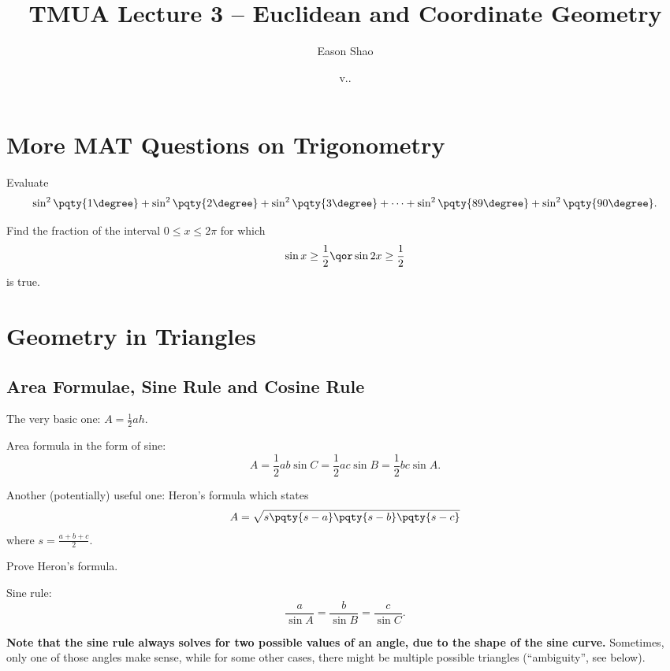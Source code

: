 \documentclass{article}
\title{TMUA Lecture 3 -- Euclidean and Coordinate Geometry}
\author{Eason Shao}
\date{v.\DATE.\COMMITSHA}
\begin{document}
\maketitle

\tableofcontents

\section*{More MAT Questions on Trigonometry}

\begin{example}
    Evaluate
    \[
        \sin^2 \pqty{1 \degree} + \sin^2 \pqty{2 \degree} + \sin^2 \pqty{3 \degree} + \cdots + \sin^2 \pqty{89 \degree} + \sin^2 \pqty{90 \degree}.
    \]
\end{example}

\begin{example}
    Find the fraction of the interval \(0 \leq x \leq 2 \pi\) for which
    \[
        \sin x \geq \frac{1}{2} \qor \sin 2x \geq \frac{1}{2}
    \]
    is true.
\end{example}

\section{Geometry in Triangles}
\subsection{Area Formulae, Sine Rule and Cosine Rule}
The very basic one: \(A = \frac{1}{2} ah\).

Area formula in the form of sine:
\[
    A = \frac{1}{2} ab \sin C = \frac{1}{2} ac \sin B = \frac{1}{2} bc \sin A.
\]

Another (potentially) useful one: Heron's formula which states
\[
    A = \sqrt{s \pqty{s - a} \pqty{s - b} \pqty{s - c}}
\]
where \(s = \frac{a + b + c}{2}\).

\begin{problem}
    Prove Heron's formula.
\end{problem}

Sine rule:
\[
    \frac{a}{\sin A} = \frac{b}{\sin B} = \frac{c}{\sin C}.
\]

\textbf{Note that the sine rule always solves for two possible values of an angle, due to the shape of the sine curve.} Sometimes, only one of those angles make sense, while for some other cases, there might be multiple possible triangles (``ambiguity'', see below).
\end{document}

